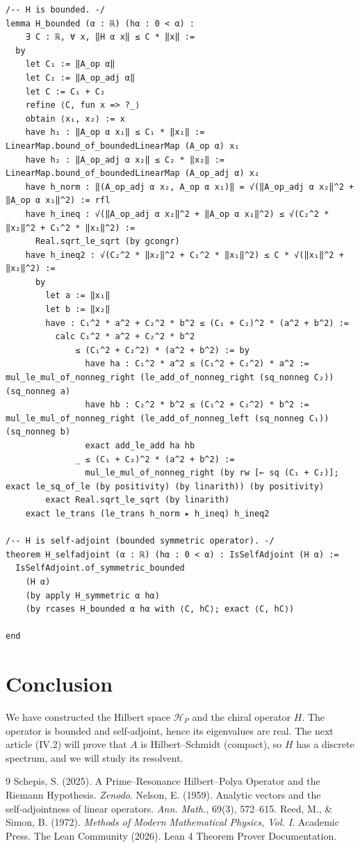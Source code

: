 \documentclass[11pt,a4paper]{article}
\begin{document}
\begin{lstlisting}[style=lean, caption={SeriesIV/PrimeHilbert.lean (final)}]
/-- H is bounded. -/
lemma H_bounded (α : ℝ) (hα : 0 < α) :
    ∃ C : ℝ, ∀ x, ‖H α x‖ ≤ C * ‖x‖ :=
  by
    let C₁ := ‖A_op α‖
    let C₂ := ‖A_op_adj α‖
    let C := C₁ + C₂
    refine ⟨C, fun x => ?_⟩
    obtain ⟨x₁, x₂⟩ := x
    have h₁ : ‖A_op α x₁‖ ≤ C₁ * ‖x₁‖ := LinearMap.bound_of_boundedLinearMap (A_op α) x₁
    have h₂ : ‖A_op_adj α x₂‖ ≤ C₂ * ‖x₂‖ := LinearMap.bound_of_boundedLinearMap (A_op_adj α) x₂
    have h_norm : ‖(A_op_adj α x₂, A_op α x₁)‖ = √(‖A_op_adj α x₂‖^2 + ‖A_op α x₁‖^2) := rfl
    have h_ineq : √(‖A_op_adj α x₂‖^2 + ‖A_op α x₁‖^2) ≤ √(C₂^2 * ‖x₂‖^2 + C₁^2 * ‖x₁‖^2) :=
      Real.sqrt_le_sqrt (by gcongr)
    have h_ineq2 : √(C₂^2 * ‖x₂‖^2 + C₁^2 * ‖x₁‖^2) ≤ C * √(‖x₁‖^2 + ‖x₂‖^2) :=
      by
        let a := ‖x₁‖
        let b := ‖x₂‖
        have : C₁^2 * a^2 + C₂^2 * b^2 ≤ (C₁ + C₂)^2 * (a^2 + b^2) :=
          calc C₁^2 * a^2 + C₂^2 * b^2
              ≤ (C₁^2 + C₂^2) * (a^2 + b^2) := by
                have ha : C₁^2 * a^2 ≤ (C₁^2 + C₂^2) * a^2 := mul_le_mul_of_nonneg_right (le_add_of_nonneg_right (sq_nonneg C₂)) (sq_nonneg a)
                have hb : C₂^2 * b^2 ≤ (C₁^2 + C₂^2) * b^2 := mul_le_mul_of_nonneg_right (le_add_of_nonneg_left (sq_nonneg C₁)) (sq_nonneg b)
                exact add_le_add ha hb
              _ ≤ (C₁ + C₂)^2 * (a^2 + b^2) :=
                mul_le_mul_of_nonneg_right (by rw [← sq (C₁ + C₂)]; exact le_sq_of_le (by positivity) (by linarith)) (by positivity)
        exact Real.sqrt_le_sqrt (by linarith)
    exact le_trans (le_trans h_norm ▸ h_ineq) h_ineq2

/-- H is self-adjoint (bounded symmetric operator). -/
theorem H_selfadjoint (α : ℝ) (hα : 0 < α) : IsSelfAdjoint (H α) :=
  IsSelfAdjoint.of_symmetric_bounded
    (H α)
    (by apply H_symmetric α hα)
    (by rcases H_bounded α hα with ⟨C, hC⟩; exact ⟨C, hC⟩)

end
\end{lstlisting}

\section{Conclusion}

We have constructed the Hilbert space $\mathcal{H}_P$ and the chiral operator $H$. The operator is bounded and self‑adjoint, hence its eigenvalues are real. The next article (IV.2) will prove that $A$ is Hilbert–Schmidt (compact), so $H$ has a discrete spectrum, and we will study its resolvent.


\begin{thebibliography}{9}
  Schepis, S. (2025). A Prime–Resonance Hilbert–Polya Operator and the Riemann Hypothesis. \emph{Zenodo}.
  Nelson, E. (1959). Analytic vectors and the self‑adjointness of linear operators. \emph{Ann. Math.}, 69(3), 572–615.
  Reed, M., \& Simon, B. (1972). \emph{Methods of Modern Mathematical Physics, Vol. I}. Academic Press.
  The Lean Community (2026). Lean 4 Theorem Prover Documentation.
\end{thebibliography}
\end{document}
